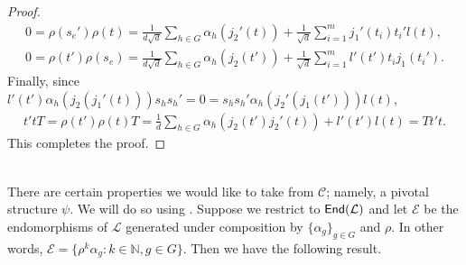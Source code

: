 \begin{proof}
\begin{align*}
0 = \rho(s_e')\rho(t) = \frac{1}{d\sqrt{d}}\sum_{h \in G}\alpha_h(j_2'(t)) + \frac{1}{\sqrt{d}}\sum_{i=1}^m j_1'(t_i)t_i'l(t),\\
0 = \rho(t')\rho(s_e) = \frac{1}{d\sqrt{d}}\sum_{h \in G}\alpha_h(j_2(t')) + \frac{1}{\sqrt{d}}\sum_{i=1}^m l'(t')t_ij_1(t_i').
\end{align*}
\noindent Finally, since $l'(t')\alpha_h(j_2(j_1'(t)))s_hs_h' = 0 = s_hs_h'\alpha_h(j_2'(j_1(t')))l(t)$,
\begin{align*}
t'tT = \rho(t')\rho(t)T = \frac{1}{d}\sum_{h \in G}\alpha_h(j_2(t')j_2'(t)) + l'(t')l(t) = Tt't.
\end{align*}
\noindent This completes the proof. %
\end{proof}\\


\noindent There are certain properties we would like to take from $\mathcal{C}$; namely, a pivotal structure $\psi$. We will do so using \cite[Lemma 2]{EG17}. Suppose we restrict to $\textup{\textsf{End}}(\mathcal{L})$ and let $\mathcal{E}$ be the endomorphisms of $\mathcal{L}$ generated under composition by $\{\alpha_g\}_{g \in G}$ and $\rho$. In other words, $\mathcal{E} = \{\rho^k\alpha_g : k \in \mathbb{N}, g \in G\}$. Then we have the following result.\\ %


